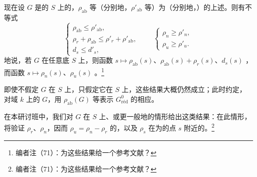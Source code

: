 现在设 $G$ 是的 $S$ 上的，$\rho_{\mathrm{ab}}$ 等（分别地，$\rho'_{\mathrm{ab}}$ 等）为（分别地，）的上述。则有不等式
\[
\begin{cases}
\rho_{\mathrm{ab}}\leq\rho'_{\mathrm{ab}},\\
\rho_r+\rho_{\mathrm{ab}}\leq\rho'_r+\rho'_{\mathrm{ab}},\\
d_s\leq d'_s,
\end{cases}
\qquad
\begin{cases}
\rho_n\geq\rho'_n,\\
\rho_u\geq\rho'_u.
\end{cases}
\]
地说，若 $G$ 在任意底 $S$ 上，则函数 $s\mapsto\rho_{\mathrm{ab}}(s)$、$\rho_{\mathrm{ab}}(s)+\rho_r(s)$、$d_s(s)$ ，而函数 $s\mapsto\rho_n(s)$、$\rho_u(s)$ 。\footnote{编者注（71）：为这些结果给一个参考文献？}

即使不假定 $G$ 在 $S$ 上，只假定它在 $S$ 上，这些结果大概仍然成立；此时约定，对域 $k$ 上的 $G$，用 $\rho_{\mathrm{ab}}(G)$ 等表示 $G^0_{\mathrm{r\text{é}d}}$ 的相应。

在本研讨班中，我们对 $G$ 在 $S$ 上、或更一般地的情形给出这类结果：在此情形，将验证 $\rho_r$、$\rho_n$，因而 $\rho_u=\rho_n-\rho_r$ 的，以及 $\rho_s$ 在为的点 $s$ 附近的。\footnote{编者注（71）：为这些结果给一个参考文献？}

